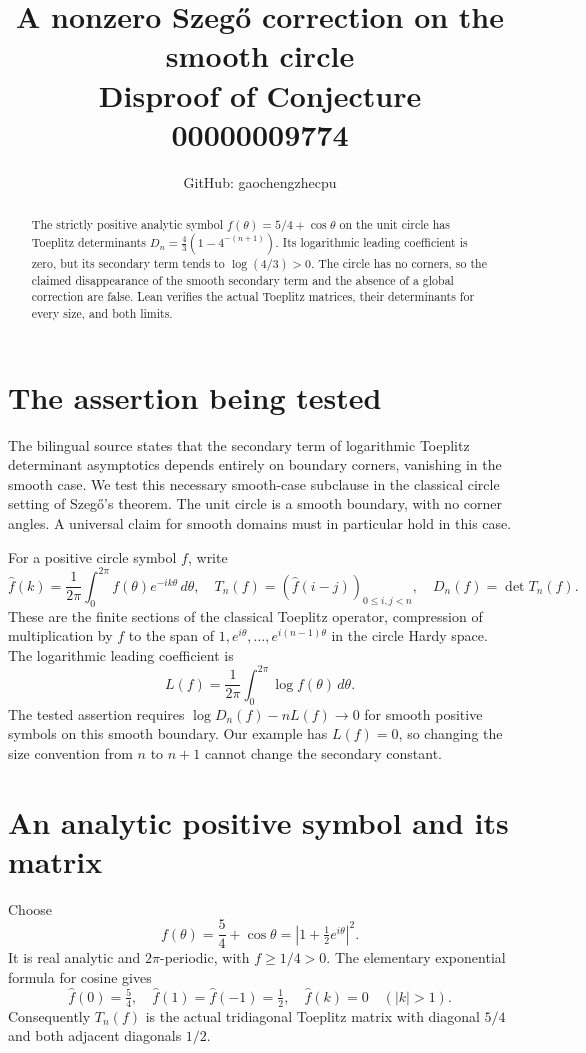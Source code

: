 \documentclass[11pt]{article}
\title{A nonzero Szeg\H{o} correction on the smooth circle\\
\large Disproof of Conjecture 00000009774}
\author{GitHub: gaochengzhecpu}\date{}
\begin{document}
\maketitle
\begin{abstract}
The strictly positive analytic symbol $f(\theta)=5/4+\cos\theta$ on
the unit circle has Toeplitz determinants
$D_n=\frac43(1-4^{-(n+1)})$. Its logarithmic leading coefficient is
zero, but its secondary term tends to $\log(4/3)>0$. The circle has no
corners, so the claimed disappearance of the smooth secondary term and
the absence of a global correction are false. Lean verifies the actual
Toeplitz matrices, their determinants for every size, and both limits.
\end{abstract}

\section*{The assertion being tested}
The bilingual source states that the secondary term of logarithmic
Toeplitz determinant asymptotics depends entirely on boundary corners,
vanishing in the smooth case. We test this necessary smooth-case
subclause in the classical circle setting of Szeg\H{o}'s theorem.
The unit circle is a smooth boundary, with no corner angles. A universal
claim for smooth domains must in particular hold in this case.

For a positive circle symbol $f$, write
\[
 \widehat f(k)=\frac1{2\pi}\int_0^{2\pi}
      f(\theta)e^{-ik\theta}\,d\theta,\quad
 T_n(f)=(\widehat f(i-j))_{0\leq i,j<n},\quad D_n(f)=\det T_n(f).
\]
These are the finite sections of the classical Toeplitz operator,
compression of multiplication by $f$ to the span of
$1,e^{i\theta},\ldots,e^{i(n-1)\theta}$ in the circle Hardy space.
The logarithmic leading coefficient is
\[
 L(f)=\frac1{2\pi}\int_0^{2\pi}\log f(\theta)\,d\theta.
\]
The tested assertion requires
$\log D_n(f)-nL(f)\to0$ for smooth positive symbols on this smooth
boundary. Our example has $L(f)=0$, so changing the size convention from
$n$ to $n+1$ cannot change the secondary constant.

\section*{An analytic positive symbol and its matrix}
Choose
\[
 f(\theta)=\frac54+\cos\theta
   =\left|1+\tfrac12e^{i\theta}\right|^2.
\]
It is real analytic and $2\pi$-periodic, with $f\geq1/4>0$.
The elementary exponential formula for cosine gives
\[
 \widehat f(0)=\tfrac54,\quad
 \widehat f(1)=\widehat f(-1)=\tfrac12,\quad
 \widehat f(k)=0\quad(|k|>1).
\]
Consequently $T_n(f)$ is the actual tridiagonal Toeplitz matrix with
diagonal $5/4$ and both adjacent diagonals $1/2$.
\end{document}
